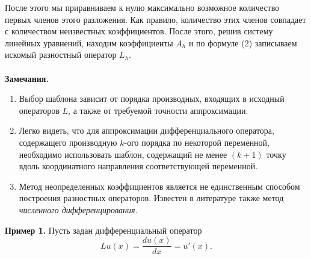 \documentclass[a4paper, 12pt]{report}
\numberwithin{equation}{section}
\begin{document}
После этого мы приравниваем к нулю максимально возможное количество первых членов этого разложения. Как правило, количество этих членов совпадает с количеством неизвестных коэффициентов. После этого, решив систему линейных уравнений, находим коэффициенты $A_h$ и по формуле (2) записываем искомый разностный оператор $L_h$.
\\\\
\textbf{Замечания.}
\begin{enumerate}
\item Выбор шаблона зависит от порядка производных, входящих в исходный операторов $L$, а также от требуемой точности аппроксимации.
\item Легко видеть, что для аппроксимации дифференциального оператора, содержащего производную $k$-ого порядка по некоторой переменной, необходимо использовать шаблон, содержащий не менее $(k+1)$ точку вдоль координатного направления соответствующей переменной.
\item Метод неопределенных коэффициентов является не единственным способом построения разностных операторов. Известен в литературе также метод \textit{численного дифференцирования}.
\end{enumerate}
\textbf{Пример 1.}
Пусть задан дифференциальный оператор $$Lu(x) = \dfrac{d u(x)}{dx} = u'(x).$$
\end{document}
